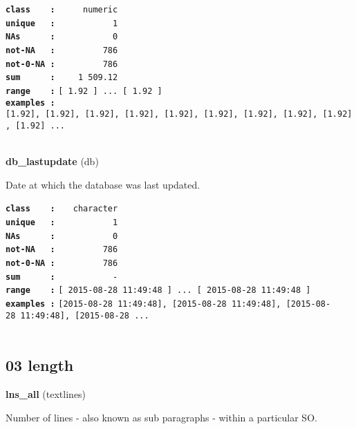 \documentclass[]{article}
\begin{document}
\textbf{\texttt{class\ \ \ \ :}} \texttt{~~~~~numeric}\\
\textbf{\texttt{unique\ \ \ :}} \texttt{~~~~~~~~~~~1}\\
\textbf{\texttt{NAs\ \ \ \ \ \ :}} \texttt{~~~~~~~~~~~0}\\
\textbf{\texttt{not-NA\ \ \ :}} \texttt{~~~~~~~~~786}\\
\textbf{\texttt{not-0-NA\ :}} \texttt{~~~~~~~~~786}\\
\textbf{\texttt{sum\ \ \ \ \ \ :}} \texttt{~~~~1~509.12}\\
\textbf{\texttt{range\ \ \ \ :}}
\texttt{{[}\ 1.92\ {]}\ ...\ {[}\ 1.92\ {]}}\\
\textbf{\texttt{examples\ :}}
\texttt{{[}1.92{]},\ {[}1.92{]},\ {[}1.92{]},\ {[}1.92{]},\ {[}1.92{]},\ {[}1.92{]},\ {[}1.92{]},\ {[}1.92{]},\ {[}1.92{]},\ {[}1.92{]}\ ...}\\

~

\textbf{db\_lastupdate} (db)

Date at which the database was last updated.

\textbf{\texttt{class\ \ \ \ :}} \texttt{~~~character}\\
\textbf{\texttt{unique\ \ \ :}} \texttt{~~~~~~~~~~~1}\\
\textbf{\texttt{NAs\ \ \ \ \ \ :}} \texttt{~~~~~~~~~~~0}\\
\textbf{\texttt{not-NA\ \ \ :}} \texttt{~~~~~~~~~786}\\
\textbf{\texttt{not-0-NA\ :}} \texttt{~~~~~~~~~786}\\
\textbf{\texttt{sum\ \ \ \ \ \ :}} \texttt{~~~~~~~~~~~-}\\
\textbf{\texttt{range\ \ \ \ :}}
\texttt{{[}\ 2015-08-28\ 11:49:48\ {]}\ ...\ {[}\ 2015-08-28\ 11:49:48\ {]}}\\
\textbf{\texttt{examples\ :}}
\texttt{{[}2015-08-28\ 11:49:48{]},\ {[}2015-08-28\ 11:49:48{]},\ {[}2015-08-28\ 11:49:48{]},\ {[}2015-08-28\ ...}\\

~

\subsection{03 length}\label{length}

\textbf{lns\_all} (textlines)

Number of lines - also known as sub paragraphs - within a particular SO.
\end{document}
